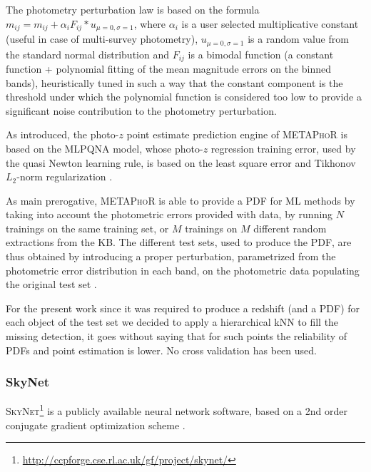 The photometry perturbation law is based on the formula $m_{ij} = m_{ij} + \alpha_{i}F_{ij}*u_{\mu=0,\sigma=1}$, where $\alpha_{i}$ is a user selected multiplicative constant (useful in case of multi-survey photometry), $u_{\mu=0,\sigma=1}$ is a random value from the standard normal distribution and $F_{ij}$ is a bimodal function (a constant function + polynomial fitting of the mean magnitude errors on the binned bands), heuristically tuned in such a way that the constant component is the threshold under which the polynomial function is considered too low to provide a significant noise contribution to the photometry perturbation.

As introduced, the photo-$z$ point estimate prediction engine of \textsc{METAPhoR} is based on the MLPQNA model, whose photo-$z$ regression training error, used by the quasi Newton learning rule, is based on the least square error and Tikhonov $L_{2}$-norm regularization \citep{Hofmann:18}.

As main prerogative, \textsc{METAPhoR} is able to provide a PDF for ML methods by taking into account the photometric errors provided with data, by running $N$ trainings on the same training set, or $M$ trainings on $M$ different random extractions from the KB. The different test sets, used to produce the PDF, are thus obtained by introducing a proper perturbation, parametrized from the photometric error distribution in each band, on the photometric data populating the original test set \citep{Brescia:18}.

For the present work since it was required to produce a redshift (and a PDF) for each object of the test set we decided to apply a hierarchical kNN to fill the missing detection, it goes without saying that for such points the reliability of PDFs and point estimation is lower. No cross validation has been used.


\subsubsection{SkyNet}
\label{sec:skynet}

\textsc{SkyNet}\footnote{\url{http://ccpforge.cse.rl.ac.uk/gf/project/skynet/}} \citep{Graff:14} is a publicly available neural network software, based on a 2nd order conjugate gradient optimization scheme \citep[see][for further details]{Graff:14}. %

